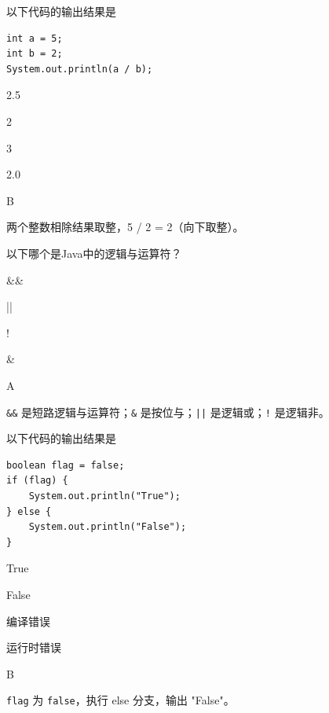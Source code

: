 \begin{question}
	以下代码的输出结果是
	\begin{lstlisting}
int a = 5;
int b = 2;
System.out.println(a / b);
\end{lstlisting}
	\begin{options}
		\item 2.5
		\item 2
		\item 3
		\item 2.0
	\end{options}
	\begin{answer}
		B
	\end{answer}
	\begin{explanation}
		两个整数相除结果取整，5 / 2 = 2（向下取整）。
	\end{explanation}
\end{question}

\begin{question}
	以下哪个是Java中的逻辑与运算符？
	\begin{options}
		\item \&\&
		\item ||
		\item !
		\item \&
	\end{options}
	\begin{answer}
		A
	\end{answer}
	\begin{explanation}
		\texttt{\&\&} 是短路逻辑与运算符；\texttt{\&} 是按位与；\texttt{||} 是逻辑或；\texttt{!} 是逻辑非。
	\end{explanation}
\end{question}

\begin{question}
	以下代码的输出结果是
	\begin{lstlisting}
boolean flag = false;
if (flag) {
    System.out.println("True");
} else {
    System.out.println("False");
}
\end{lstlisting}
	\begin{options}
		\item True
		\item False
		\item 编译错误
		\item 运行时错误
	\end{options}
	\begin{answer}
		B
	\end{answer}
	\begin{explanation}
		\texttt{flag} 为 \texttt{false}，执行 else 分支，输出 "False"。
	\end{explanation}
\end{question}

